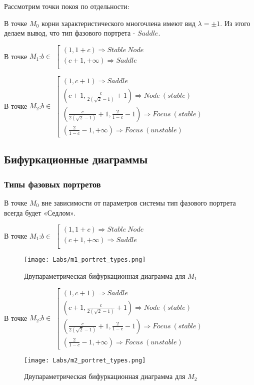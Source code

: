 \documentclass[a4paper,14pt]{extarticle}
\begin{document}
Рассмотрим точки покоя по отдельности:

В точке $M_0$ корни характеристического многочлена имеют вид $\lambda = \pm 1$. Из этого делаем вывод, что тип фазового портрета - $Saddle$.

В точке $M_1$:$b \in$
$\left[ 
\begin{array}{l}
  (1, 1 + c) \Rightarrow Stable\ Node\\
  (c + 1, +\infty) \Rightarrow Saddle \\
\end{array} 
\right.$

В точке $M_2$:$b \in$
$\left[ 
\begin{array}{l}
 \left(1, c+1 \right) \Rightarrow Saddle \\
 \left(c+1, \frac{c}{2(\sqrt2-1)}+1\right) \Rightarrow Node\ (stable) \\
 \left(\frac{c}{2(\sqrt2-1)}+1, \frac{2}{1 - c}-1\right) \Rightarrow  Focus\ (stable) \\
 \left(\frac{2}{1 - c}-1, +\infty \right) \Rightarrow Focus\ (unstable)
\end{array} 
\right.$


\subsection{Бифуркационные диаграммы}
\subsubsection{Типы фазовых портретов}

В точке $M_0$ вне зависимости от параметров системы тип фазового портрета всегда будет «Седлом».

В точке $M_1$:$b \in $
$\left[ 
\begin{array}{l}
  (1, 1 + c) \Rightarrow Stable\ Node\\
  (c + 1, +\infty) \Rightarrow Saddle \\
\end{array} 
\right.$
\begin{figure}[!h]
\centering
\texttt{[image: Labs/m1\_portret\_types.png]}
\caption{Двупараметрическая бифуркационная диаграмма для $M_1$}
\label{bif_m1}
\end{figure}


В точке $M_2$:$b \in$
$\left[ 
\begin{array}{l}
 \left(1, c+1 \right) \Rightarrow Saddle \\
 \left(c+1, \frac{c}{2(\sqrt2-1)}+1\right) \Rightarrow Node\ (stable) \\
 \left(\frac{c}{2(\sqrt2-1)}+1, \frac{2}{1 - c}-1\right) \Rightarrow  Focus\ (stable) \\
 \left(\frac{2}{1 - c}-1, +\infty \right) \Rightarrow Focus\ (unstable)
\end{array} 
\right.$
\begin{figure}[!h]
\centering
\texttt{[image: Labs/m2\_portret\_types.png]}
\caption{Двупараметрическая бифуркационная диаграмма для $M_2$}
\label{bif_m2}
\end{figure}
\end{document}
